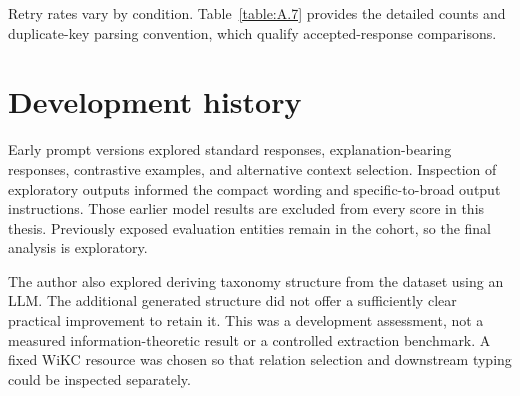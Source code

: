 Retry rates vary by condition. Table~\ref{table:A.7} provides the detailed counts and duplicate-key parsing convention, which qualify accepted-response comparisons.


\FloatBarrier

\section{Development history}

Early prompt versions explored standard responses, explanation-bearing responses, contrastive examples, and alternative context selection. Inspection of exploratory outputs informed the compact wording and specific-to-broad output instructions. Those earlier model results are excluded from every score in this thesis. Previously exposed evaluation entities remain in the cohort, so the final analysis is exploratory.


The author also explored deriving taxonomy structure from the dataset using an LLM. The additional generated structure did not offer a sufficiently clear practical improvement to retain it. This was a development assessment, not a measured information-theoretic result or a controlled extraction benchmark. A fixed WiKC resource was chosen so that relation selection and downstream typing could be inspected separately.

